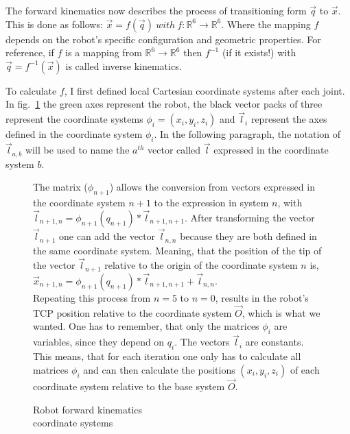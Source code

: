 The forward kinematics now describes the process of transitioning form $ \vec{q} $ to $ \vec{x} $. This is done as follows: $ \vec{x} = f(\vec{q})~with~f: \mathbb{R}^6 \rightarrow \mathbb{R}^6$. Where the mapping $f$ depends on the robot's specific configuration and geometric properties. For reference, if $f$ is a mapping from $\mathbb{R}^6 \rightarrow \mathbb{R}^6$ then $f^{-1}$ (if it exists!) with $ \vec{q} = f^{-1}(\vec{x})$ is called inverse kinematics. 

To calculate $f$, I first defined local Cartesian coordinate systems after each joint. In fig.~\ref{Fig:ForwardKinematics} the green axes represent the robot, the black vector packs of three represent the coordinate systems $\phi_i = (x_i, y_i, z_i)$ and $\vec{l}_i$ represent the axes defined in the coordinate system $\phi_i$. In the following paragraph, the notation of  $\vec{l}_{a,b}$ will be used to name the $a^{th}$ vector called $\vec{l}$ expressed in the coordinate system $b$.

\begin{figure}[!h]
	\begin{minipage}{0.45\textwidth}
		\centering
		
		\caption{Robot forward kinematics\\coordinate systems}
		\label{Fig:ForwardKinematics}
	\end{minipage}\hfill
	\begin{minipage}{0.45\textwidth}
		The matrix ($\phi_{n+1}$) allows the conversion from vectors expressed in the coordinate system $n + 1$ to the expression in system $n$, with $\vec{l}_{n+1,n} = \phi_{n+1}(q_{n+1}) * \vec{l}_{n+1,n+1}$. After transforming the vector $\vec{l}_{n+1}$ one can add the vector $\vec{l}_{n,n}$ because they are both defined in the same coordinate system. Meaning, that the position of the tip of the vector $\vec{l}_{n+1}$ relative to the origin of the coordinate system $n$ is, $\vec{x}_{n+1,n} = \phi_{n+1}(q_{n+1}) * \vec{l}_{n+1,n+1} + \vec{l}_{n,n} $.\\
		Repeating this process from $n = 5$ to $n = 0$, results in the robot's TCP position relative to the coordinate system $\vec{O}$, which is what we wanted. One has to remember, that only the matrices $\phi_{i}$ are variables, since they depend on $q_i$. The vectors $\vec{l}_i$ are constants. This means, that for each iteration one only has to calculate all matrices $\phi_i$ and can then calculate the positions $(x_i, y_i, z_i)$ of each coordinate system relative to the base system $\vec{O}$.
	\end{minipage}
\end{figure}

